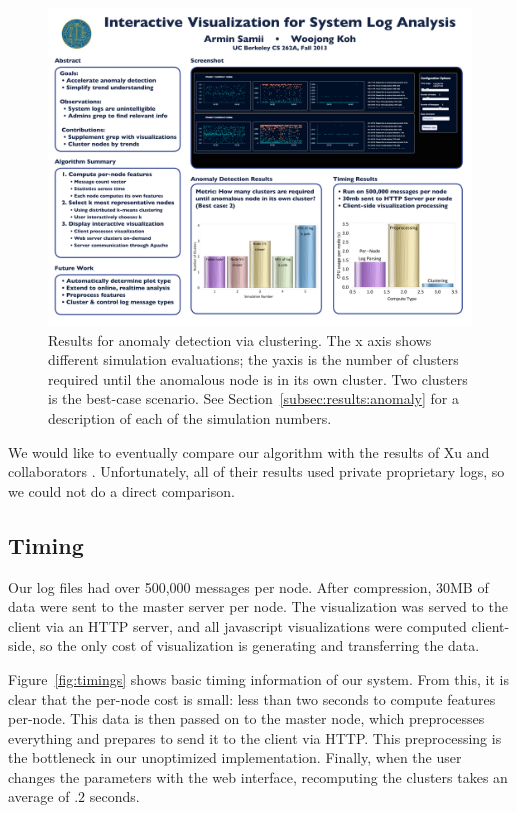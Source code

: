 \documentclass[conference]{style/acmsiggraph}
\begin{document}
\begin{figure}[t]
    \centering
    \includegraphics[width=1.0\columnwidth]{images/anomaly.pdf}
    \caption{Results for anomaly detection via clustering. The x axis shows different simulation evaluations; the yaxis is the number of clusters required until the anomalous node is in its own cluster. Two clusters is the best-case scenario. See Section~\ref{subsec:results:anomaly} for a description of each of the simulation numbers.}
    \label{fig:anomaly}
\end{figure}

We would like to eventually compare our algorithm with the results of Xu and collaborators \cite{Xu09}.
Unfortunately, all of their results used private proprietary logs, so we could not do a direct comparison.

\subsection{Timing}
\label{subsec:results:timing}
Our log files had over 500,000 messages per node.
After compression, 30MB of data were sent to the master server per node.
The visualization was served to the client via an HTTP server, and all javascript visualizations were computed client-side, so the only cost of visualization is generating and transferring the data.

Figure~\ref{fig:timings} shows basic timing information of our system.
From this, it is clear that the per-node cost is small: less than two seconds to compute features per-node.
This data is then passed on to the master node, which preprocesses everything and prepares to send it to the client via HTTP.
This preprocessing is the bottleneck in our unoptimized implementation.
Finally, when the user changes the parameters with the web interface, recomputing the clusters takes an average of $.2$ seconds.
\end{document}
